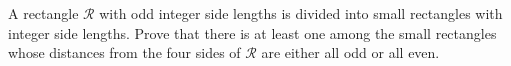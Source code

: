 A rectangle $\mathcal{R}$ with odd integer side lengths is divided into small rectangles with integer side lengths. Prove that there is at least one among the small rectangles whose distances from the four sides of $\mathcal{R}$ are either all odd or all even.
